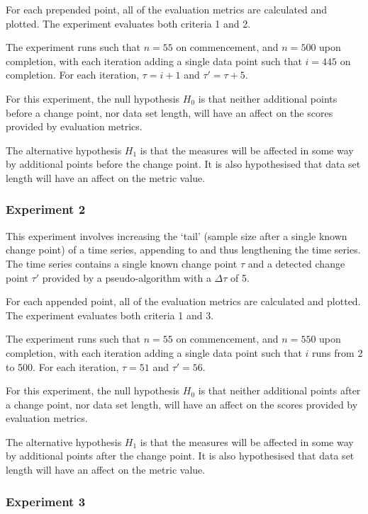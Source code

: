 \documentclass{uvamscse}	%
\begin{document}
For each prepended point, all of the evaluation metrics are calculated and plotted. The experiment evaluates both criteria 1 and 2.

The experiment runs such that $n = 55$ on commencement, and $n = 500$ upon completion, with each iteration adding a single data point such that $i = 445$ on completion. For each iteration, $\tau = i + 1$ and $\tau' = \tau + 5$.

For this experiment, the null hypothesis $H_0$ is that neither additional points before a change point, nor data set length, will have an affect on the scores provided by evaluation metrics.

The alternative hypothesis $H_1$ is that the measures will be affected in some way by additional points before the change point. It is also hypothesised that data set length will have an affect on the metric value.


\subsubsection{Experiment 2}

This experiment involves increasing the `tail' (sample size after a single known change point) of a time series, appending to and thus lengthening the time series. The time series contains a single known change point $\tau$ and a detected change point $\tau'$ provided by a pseudo-algorithm with a $\Delta \tau$ of 5.

For each appended point, all of the evaluation metrics are calculated and plotted. The experiment evaluates both criteria 1 and 3.

The experiment runs such that $n=55$ on commencement, and $n=550$ upon completion, with each iteration adding a single data point such that $i$ runs from 2 to 500. For each iteration, $\tau = 51$ and $\tau' = 56$.

For this experiment, the null hypothesis $H_0$ is that neither additional points after a change point, nor data set length, will have an affect on the scores provided by evaluation metrics.

The alternative hypothesis $H_1$ is that the measures will be affected in some way by additional points after the change point. It is also hypothesised that data set length will have an affect on the metric value.

\subsubsection{Experiment 3}
\end{document}

